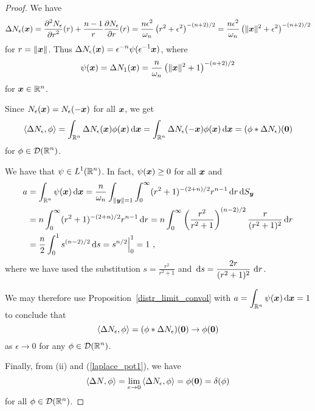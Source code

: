 \begin{proof}
 We have
\[
\Delta N_\epsilon({\bm{x}}) = \frac{\displaystyle \partial^{2}{N_\epsilon}} {\displaystyle \partial r^{2}}(r) +
\frac{n-1}{r} \frac{\partial{N_\epsilon}}{\partial r}(r)
= \frac{n\epsilon^2}{\omega_n} \left(r^2+\epsilon^2 \right)^{-(n+2)/2}
= \frac{n\epsilon^2}{\omega_n}
\left(\|{\bm{x}}\|^2+\epsilon^2 \right)^{-(n+2)/2}
\]
for $r = \|{\bm{x}}\|$. Thus
$\displaystyle
\Delta N_\epsilon({\bm{x}}) = \epsilon^{-n} \psi(\epsilon^{-1} {\bm{x}})$,
where
\[
\psi({\bm{x}}) = \Delta N_1({\bm{x}}) = \frac{n}{\omega_n}
\left(\|{\bm{x}}\|^2 + 1 \right)^{-(n+2)/2}
\]
for ${\bm{x}} \in \mathbb{R}^n$.

Since $N_\epsilon({\bm{x}}) = N_\epsilon(-{\bm{x}})$ for all
${\bm{x}}$, we get
\[
\left\langle{\Delta N_\epsilon} , {\phi}\right\rangle =
\int_{\mathbb{R}^n} \Delta N_\epsilon({\bm{x}}) \phi({\bm{x}}) \,\mathrm{d}{{\bm{x}}}
= \int_{\mathbb{R}^n} \Delta N_\epsilon(-{\bm{x}}) \phi({\bm{x}}) \,\mathrm{d}{{\bm{x}}} \\
= (\phi \ast \Delta N_\epsilon)({\bm{0}})
\]
for $\displaystyle \phi \in \mathcal{D}(\mathbb{R}^n)$.

We have that $\displaystyle \psi \in L^1(\mathbb{R}^n)$.  In fact,
$\psi({\bm{x}}) \geq 0$ for all ${\bm{x}}$ and
\begin{align*}
a &= \int_{\RR^n} \psi(\VEC{x}) \dx{\VEC{x}}
= \frac{n}{\omega_n} \int_{\|\VEC{y}\|=1} \int_0^\infty
(r^2+1)^{-(2+n)/2} r^{n-1} \dx{r} \dss{S}{y} \\
&= n \int_0^\infty (r^2+1)^{-(2+n)/2} r^{n-1} \dx{r}
= n \int_0^\infty \left(\frac{r^2}{r^2+1}\right)^{(n-2)/2}
\frac{r}{(r^2+1)^2} \dx{r} \\
&= \frac{n}{2} \int_0^1 s^{(n-2)/2} \dx{s} = s^{n/2}\Big|_0^1 = 1 \ ,
\end{align*}
where we have used the substitution $\displaystyle s = \frac{r^2}{r^2+1}$
and $\displaystyle \,\mathrm{d}{s} = \frac{2r}{(r^2+1)^2} \, \,\mathrm{d}{r}$.

We may therefore use Proposition~\ref{distr_limit_convol} with
$\displaystyle a = \int_{\mathbb{R}^n} \psi({\bm{x}}) \,\mathrm{d}{{\bm{x}}} = 1$
to conclude that
\begin{equation} \label{laplace_pot1}
\left\langle{\Delta N_\epsilon} , {\phi}\right\rangle = (\phi \ast \Delta N_\epsilon)({\bm{0}})
\rightarrow \phi({\bm{0}})
\end{equation}
as $\epsilon \rightarrow 0$ for any $\displaystyle \phi \in \mathcal{D}(\mathbb{R}^n)$.

Finally, from (ii) and (\ref{laplace_pot1}), we have
\[
\left\langle{\Delta N} , {\phi}\right\rangle =
\lim_{e\rightarrow 0} \left\langle{\Delta N_\epsilon} , {\phi}\right\rangle 
= \phi({\bm{0}}) = \delta(\phi)
\]
for all $\phi\in \mathcal{D}(\mathbb{R}^n)$.
\end{proof}

